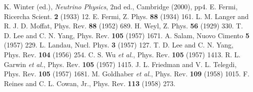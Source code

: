 \begin{thebibliography}{99}
K. Winter (ed.), \emph{Neutrino Physics}, 2nd ed.,
  Cambridge (2000), pp4.
E. Fermi, Ricercha Scient. \textbf{2} (1933) 12.
E. Fermi, Z. Phys. \textbf{88} (1934) 161.
L. M. Langer and R. J. D. Moffat, Phys. Rev.
  \textbf{88} (1952) 689.
H. Weyl, Z. Phys. \textbf{56} (1929) 330.
T. D. Lee and C. N. Yang, Phys. Rev. \textbf{105}
  (1957) 1671.
A. Salam, Nuovo Cimento \textbf{5} (1957) 229.
L. Landau, Nucl. Phys. \textbf{3} (1957) 127.
T. D. Lee and C. N. Yang, Phys. Rev. \textbf{104}
  (1956) 254.
C. S. Wu \textit{et al.}, Phys. Rev. \textbf{105} (1957)
  1413.
R. L. Garwin \textit{et al.}, Phys. Rev. \textbf{105}
  (1957) 1415.
J. L. Friedman and V. L. Telegdi, Phys. Rev.
  \textbf{105} (1957) 1681.
M. Goldhaber \textit{et al.}, Phys. Rev. \textbf{109}
  (1958) 1015.
F. Reines and C. L. Cowan, Jr., Phys. Rev. \textbf{113}
  (1958) 273.
\end{thebibliography}


